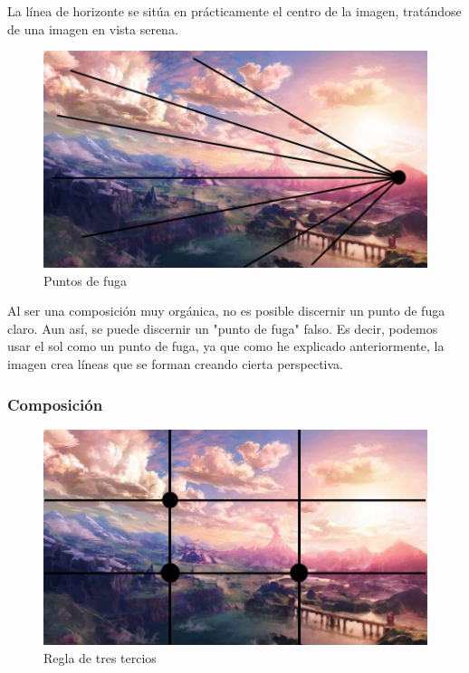 \documentclass[12pt]{article}
\begin{document}
        La línea de horizonte se sitúa en prácticamente el centro de la imagen, tratándose de una imagen en vista serena. 

        \newpage

        \begin{figure}[H]
          \centering
          \includegraphics[scale = 0.4]{images/Jesus/Seccion2/Group 3.JPEG}
          \caption{Puntos de fuga}
        \end{figure}
        Al ser una composición muy orgánica, no es posible discernir un punto de fuga claro. Aun así, se puede discernir un "punto de fuga" falso. Es decir, podemos usar el sol como un punto de fuga, ya que como he explicado anteriormente, la imagen crea líneas que se forman creando cierta perspectiva.

        \newpage

        
        \subsubsection{Composición}
        
          \begin{figure}[H]
            \centering
            \includegraphics[scale = 0.4]{images/Jesus/Seccion2/Group 1.JPEG}
            \caption{Regla de tres tercios}
          \end{figure}
          
\end{document}
